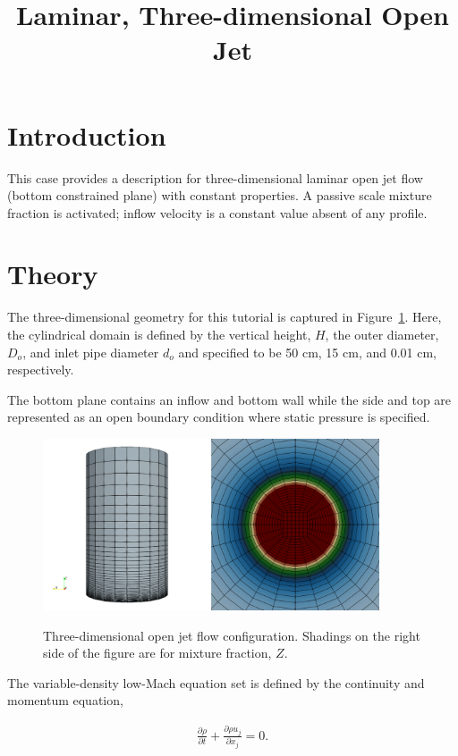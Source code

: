 \documentclass{article}
\title{Laminar, Three-dimensional Open Jet}
\date{}
\begin{document}
\maketitle

\section{Introduction}
This case provides a description for three-dimensional laminar
open jet flow (bottom constrained plane) with constant properties. A passive
scale mixture fraction is activated; inflow velocity is a constant value
absent of any profile.

\section{Theory}
The three-dimensional geometry for this tutorial is captured in 
Figure~\ref{fig:geom}. Here, the cylindrical domain is defined by the 
vertical height, $H$, the outer diameter, $D_o$, and inlet pipe diameter $d_o$ and 
specified to be 50 cm, 15 cm, and 0.01 cm, respectively. 

The bottom plane contains an inflow and bottom wall while the side and top are represented
as an open boundary condition where static pressure is specified.

\begin{figure}[!htbp]
  \centering
  {
   \includegraphics[height=2.0in]{images/3d_hex8_open_jet_geom.png}
  }
  \caption{Three-dimensional open jet flow configuration. Shadings on the
right side of the figure are for mixture fraction, $Z$.}
  \label{fig:geom}
\end{figure}

The variable-density low-Mach equation set is defined by the continuity and momentum equation,

\begin{align}
  \frac {\partial \rho }{\partial t} + \frac{ \partial \rho u_j}{\partial x_j} = 0.
\label{eq:contEq}
\end{align} 
\end{document}
